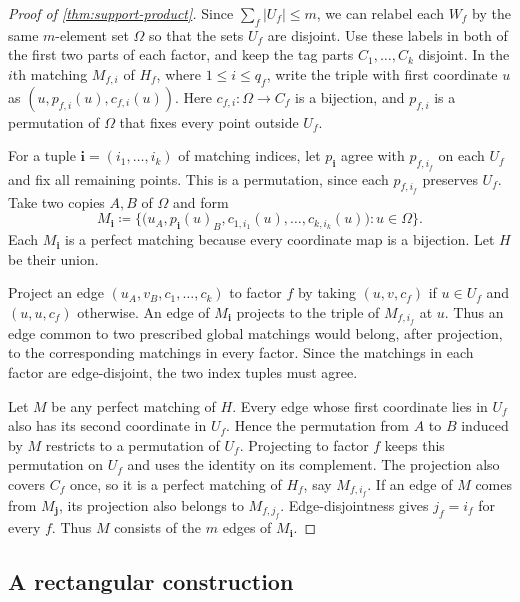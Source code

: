 \documentclass[10pt]{article}
\numberwithin{equation}{section}
\theoremstyle{definition}
\begin{document}
\begin{proof}[Proof of \cref{thm:support-product}]
Since $\sum_f|U_f|\le m$, we can relabel each $W_f$ by the same $m$-element set $\Omega$ so that the sets $U_f$ are disjoint. Use these labels in both of the first two parts of each factor, and keep the tag parts $C_1,\ldots,C_k$ disjoint. In the $i$th matching $M_{f,i}$ of $H_f$, where $1\le i\le q_f$, write the triple with first coordinate $u$ as $(u,p_{f,i}(u),c_{f,i}(u))$. Here $c_{f,i}\colon\Omega\to C_f$ is a bijection, and $p_{f,i}$ is a permutation of $\Omega$ that fixes every point outside $U_f$.

For a tuple $\mathbf i=(i_1,\ldots,i_k)$ of matching indices, let $p_{\mathbf i}$ agree with $p_{f,i_f}$ on each $U_f$ and fix all remaining points. This is a permutation, since each $p_{f,i_f}$ preserves $U_f$. Take two copies $A,B$ of $\Omega$ and form
\[
 M_{\mathbf i}\coloneqq\bigl\{
 \bigl(u_A,p_{\mathbf i}(u)_B,c_{1,i_1}(u),\ldots,c_{k,i_k}(u)\bigr)
 \colon u\in\Omega\bigr\}.
\]
Each $M_{\mathbf i}$ is a perfect matching because every coordinate map is a bijection. Let $H$ be their union.

Project an edge $(u_A,v_B,c_1,\ldots,c_k)$ to factor $f$ by taking $(u,v,c_f)$ if $u\in U_f$ and $(u,u,c_f)$ otherwise. An edge of $M_{\mathbf i}$ projects to the triple of $M_{f,i_f}$ at $u$. Thus an edge common to two prescribed global matchings would belong, after projection, to the corresponding matchings in every factor. Since the matchings in each factor are edge-disjoint, the two index tuples must agree.

Let $M$ be any perfect matching of $H$. Every edge whose first coordinate lies in $U_f$ also has its second coordinate in $U_f$. Hence the permutation from $A$ to $B$ induced by $M$ restricts to a permutation of $U_f$. Projecting to factor $f$ keeps this permutation on $U_f$ and uses the identity on its complement. The projection also covers $C_f$ once, so it is a perfect matching of $H_f$, say $M_{f,i_f}$. If an edge of $M$ comes from $M_{\mathbf j}$, its projection also belongs to $M_{f,j_f}$. Edge-disjointness gives $j_f=i_f$ for every $f$. Thus $M$ consists of the $m$ edges of $M_{\mathbf i}$.
\end{proof}

\subsection{A rectangular construction}\label{app:rectangular}
\end{document}
